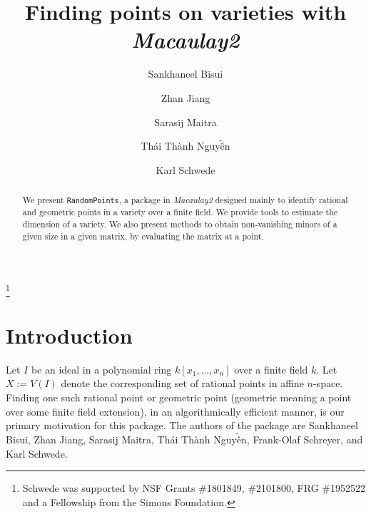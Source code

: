 \documentclass[11pt]{amsart}
\theoremstyle{definition}
\begin{document}
\title{Finding points on varieties with \emph{Macaulay2}}
\author{Sankhaneel Bisui}
\address{Department of Mathematics, University of Manitoba, Winnipeg, MB R3T 2M8}
\author{Zhan Jiang}
\address{Department of Mathematics, University of Michigan, 530 Church St, Ann Arbor, MI 48109}
\author{Sarasij Maitra}
\address{Department of Mathematics, University of Utah, 155 S 1400 E Room 233, Salt Lake City, UT, 84112}
\author{Th\'ai Th\`anh Nguy$\tilde{\text{\^e}}$n}
\address{Department of Mathematics, McMaster University, Hamilton, Ontario, L8S 4L8}
\author{Karl Schwede}
\address{Department of Mathematics, University of Utah, 155 S 1400 E Room 233, Salt Lake City, UT, 84112}

\thanks{Schwede was supported by NSF Grants \#1801849, \#2101800, FRG \#1952522 and a Fellowship from the Simons Foundation.}

\begin{abstract}
  We present {\tt RandomPoints}, a package in \emph{Macaulay2} designed mainly to identify rational and geometric points in a variety over a finite field.  We provide tools to estimate the dimension of a variety.  We also present methods to obtain non-vanishing minors of a given size in a given matrix, by evaluating the matrix at a point.  %
\end{abstract}



\maketitle

\section{Introduction}
    Let $I$ be an ideal in a polynomial ring $k[x_1,\dots, x_n]$ over a finite field $k$. Let $X:=V(I)$ denote the corresponding set of rational points in affine $n$-space. Finding one such rational point or geometric point (geometric meaning a point over some finite field extension), in an algorithmically efficient manner, is our primary motivation for this package. The authors of the package are Sankhaneel Bisui, Zhan Jiang, Sarasij Maitra, Th\'ai Th\`anh Nguy$\tilde{\text{\^e}}$n, Frank-Olaf Schreyer, and Karl Schwede.
\end{document}
